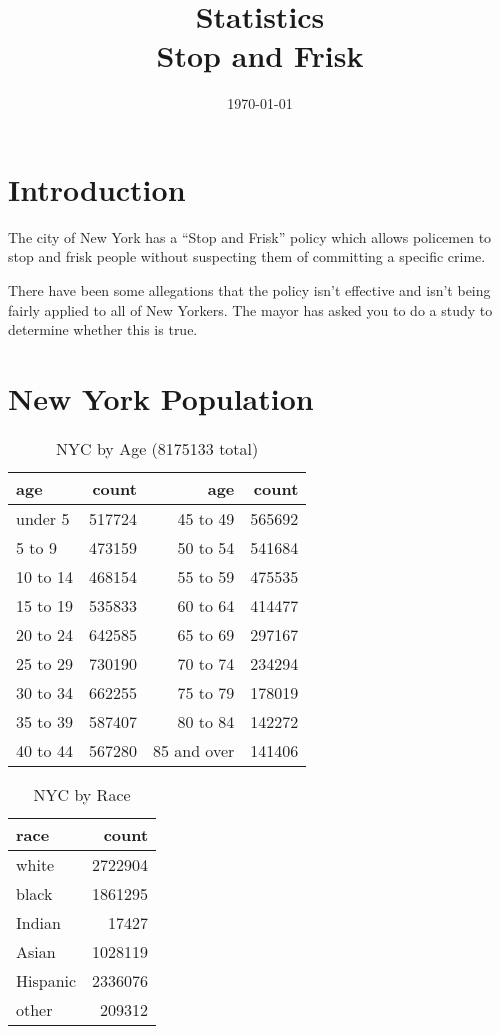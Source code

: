 \documentclass[letterpaper]{exam}
\title{Statistics \\ Stop and Frisk}
\date{\today}
\author{}
\begin{document}
  \maketitle

  \section{Introduction}
  The city of New York has a ``Stop and Frisk'' policy which allows policemen to
  stop and frisk people without suspecting them of committing a specific crime.

  There have been some allegations that the policy isn't effective and isn't
  being fairly applied to all of New Yorkers.  The mayor has asked you to do a
  study to determine whether this is true.


  \section{New York Population}
  \begin{table}[H]
    \centering
    \begin{tabular}{lr|rr}
      \toprule
      age      & count  & age         & count\\
      \midrule
      under 5  & 517724 & 45 to 49    & 565692 \\
      5 to 9   & 473159 & 50 to 54    & 541684 \\
      10 to 14 & 468154 & 55 to 59    & 475535 \\
      15 to 19 & 535833 & 60 to 64    & 414477 \\
      20 to 24 & 642585 & 65 to 69    & 297167 \\
      25 to 29 & 730190 & 70 to 74    & 234294 \\
      30 to 34 & 662255 & 75 to 79    & 178019 \\
      35 to 39 & 587407 & 80 to 84    & 142272 \\
      40 to 44 & 567280 & 85 and over & 141406 \\
      \bottomrule
    \end{tabular}
    \caption{NYC by Age (8175133 total)}
  \end{table}

  \begin{table}[H]
    \centering
    \begin{tabular}{lr}
      \toprule
      race     & count \\
      \midrule
      white    & 2722904 \\
      black    & 1861295 \\
      Indian   & 17427 \\
      Asian    & 1028119 \\
      Hispanic & 2336076 \\
      other    & 209312 \\
      \bottomrule
    \end{tabular}
    \caption{NYC by Race}
  \end{table}
\end{document}
